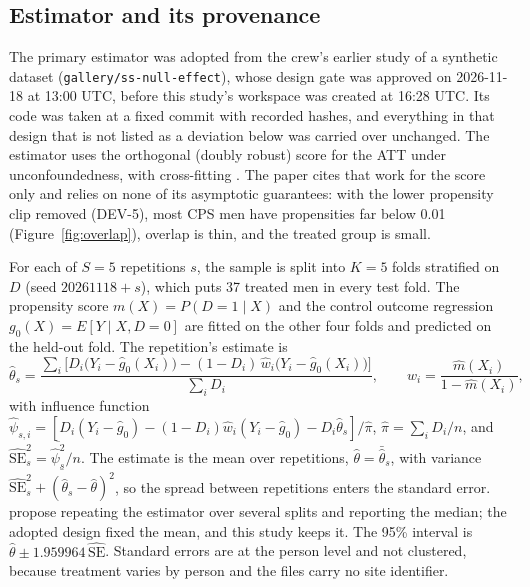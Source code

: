 \documentclass[11pt]{article}
\newcommand{\var}[1]{\texttt{#1}}
\begin{document}
\subsection{Estimator and its provenance}

The primary estimator was adopted from the crew's earlier study of a synthetic dataset
(\var{gallery/ss-null-effect}), whose design gate was approved on 2026-11-18 at 13:00 UTC,
before this study's workspace was created at 16:28 UTC. Its code was taken at a fixed
commit with recorded hashes, and everything in that design that is not listed as a
deviation below was carried over unchanged. The estimator uses the orthogonal (doubly
robust) score for the ATT under unconfoundedness, with cross-fitting
\citep[Sec.~5.1]{chernozhukov2018}. The paper cites that work for the score only and relies
on none of its asymptotic guarantees: with the lower propensity clip removed (DEV-5), most CPS
men have propensities far below 0.01 (Figure~\ref{fig:overlap}), overlap is thin, and the
treated group is small.

For each of $S = 5$ repetitions $s$, the sample is split into $K = 5$ folds stratified on
$D$ (seed $20261118 + s$), which puts 37 treated men in every test fold. The propensity score
$m(X) = P(D = 1 \mid X)$ and the control outcome regression $g_0(X) = E[Y \mid X, D = 0]$
are fitted on the other four folds and predicted on the held-out fold. The repetition's
estimate is
\begin{equation}
  \hat\theta_s = \frac{\sum_i \bigl[ D_i \bigl(Y_i - \hat g_0(X_i)\bigr)
     - (1 - D_i)\, \hat w_i \bigl(Y_i - \hat g_0(X_i)\bigr) \bigr]}{\sum_i D_i},
  \qquad \hat w_i = \frac{\hat m(X_i)}{1 - \hat m(X_i)},
  \label{eq:aipw}
\end{equation}
with influence function
$\hat\psi_{s,i} = [D_i (Y_i - \hat g_0) - (1 - D_i) \hat w_i (Y_i - \hat g_0) - D_i \hat\theta_s]/\hat\pi$,
$\hat\pi = \sum_i D_i / n$, and $\widehat{\mathrm{SE}}_s^2 = \overline{\hat\psi_s^2}/n$. The
estimate is the mean over repetitions, $\hat\theta = \bar{\hat\theta}_s$, with variance
$\overline{\widehat{\mathrm{SE}}_s^2 + (\hat\theta_s - \hat\theta)^2}$, so the spread between
repetitions enters the standard error. \citet{chernozhukov2018} propose repeating the
estimator over several splits and reporting the median; the adopted design fixed the mean,
and this study keeps it. The 95\% interval is
$\hat\theta \pm 1.959964\,\widehat{\mathrm{SE}}$. Standard errors are at the person level and
not clustered, because treatment varies by person and the files carry no site identifier.
\end{document}

